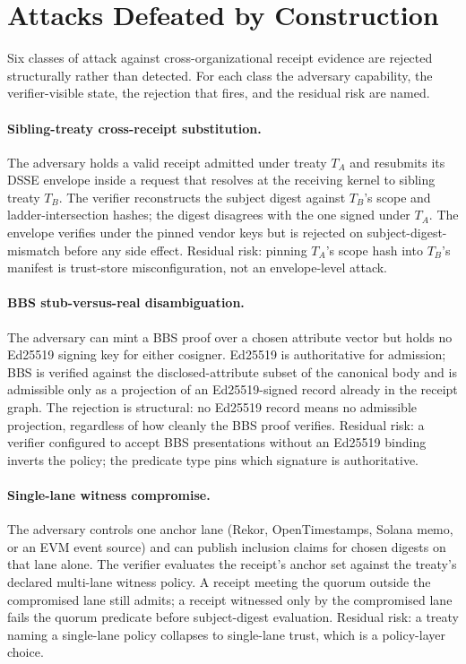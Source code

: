 \section{Attacks Defeated by Construction}
\label{sec:attacks}

Six classes of attack against cross-organizational receipt evidence are rejected structurally rather than detected. For each class the adversary capability, the verifier-visible state, the rejection that fires, and the residual risk are named.

\paragraph{Sibling-treaty cross-receipt substitution.} The adversary holds a valid receipt admitted under treaty $T_A$ and resubmits its DSSE envelope inside a request that resolves at the receiving kernel to sibling treaty $T_B$. The verifier reconstructs the subject digest against $T_B$'s scope and ladder-intersection hashes; the digest disagrees with the one signed under $T_A$. The envelope verifies under the pinned vendor keys but is rejected on subject-digest-mismatch before any side effect. Residual risk: pinning $T_A$'s scope hash into $T_B$'s manifest is trust-store misconfiguration, not an envelope-level attack.

\paragraph{BBS stub-versus-real disambiguation.} The adversary can mint a BBS proof over a chosen attribute vector but holds no Ed25519 signing key for either cosigner. Ed25519 is authoritative for admission; BBS is verified against the disclosed-attribute subset of the canonical body and is admissible only as a projection of an Ed25519-signed record already in the receipt graph. The rejection is structural: no Ed25519 record means no admissible projection, regardless of how cleanly the BBS proof verifies. Residual risk: a verifier configured to accept BBS presentations without an Ed25519 binding inverts the policy; the predicate type pins which signature is authoritative.

\paragraph{Single-lane witness compromise.} The adversary controls one anchor lane (Rekor, OpenTimestamps, Solana memo, or an EVM event source) and can publish inclusion claims for chosen digests on that lane alone. The verifier evaluates the receipt's anchor set against the treaty's declared multi-lane witness policy. A receipt meeting the quorum outside the compromised lane still admits; a receipt witnessed only by the compromised lane fails the quorum predicate before subject-digest evaluation. Residual risk: a treaty naming a single-lane policy collapses to single-lane trust, which is a policy-layer choice.

